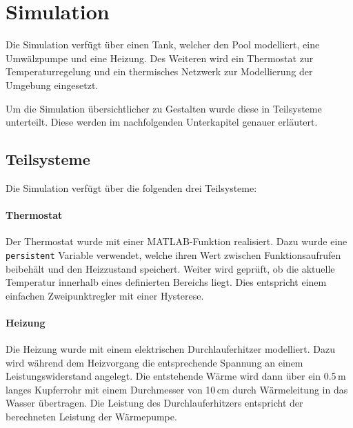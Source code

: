 \section{Simulation}
\label{sec:Simulation}
Die Simulation verfügt über einen Tank, welcher den Pool modelliert, eine Umwälzpumpe und eine Heizung. Des Weiteren wird ein Thermostat zur Temperaturregelung und ein thermisches Netzwerk zur Modellierung der Umgebung eingesetzt.

Um die Simulation übersichtlicher zu Gestalten wurde diese in Teilsysteme unterteilt. Diese werden im nachfolgenden Unterkapitel genauer erläutert.

\subsection{Teilsysteme}
\label{subsec:Teilsysteme}
Die Simulation verfügt über die folgenden drei Teilsysteme:

\paragraph{Thermostat}
Der Thermostat wurde mit einer MATLAB-Funktion realisiert. Dazu wurde eine \texttt{persistent} Variable verwendet, welche ihren Wert zwischen Funktionsaufrufen beibehält und den Heizzustand speichert. Weiter wird geprüft, ob die aktuelle Temperatur innerhalb eines definierten Bereichs liegt. Dies entspricht einem einfachen Zweipunktregler mit einer Hysterese.

\paragraph{Heizung}
Die Heizung wurde mit einem elektrischen Durchlauferhitzer modelliert. Dazu wird während dem Heizvorgang die entsprechende Spannung an einem Leistungswiderstand angelegt. Die entstehende Wärme wird dann über ein 0.5\,m langes Kupferrohr mit einem Durchmesser von 10\,cm durch Wärmeleitung in das Wasser übertragen. Die Leistung des Durchlauferhitzers entspricht der berechneten Leistung der Wärmepumpe.

